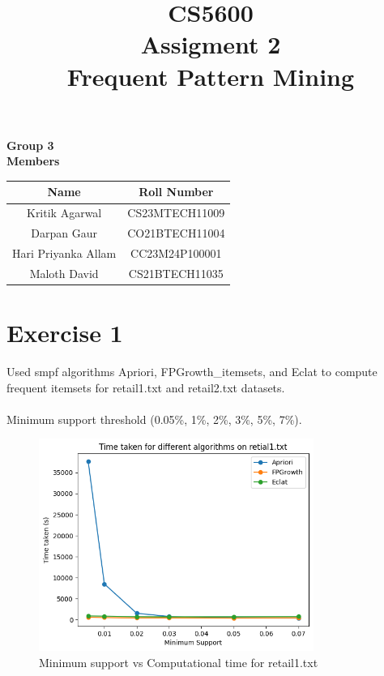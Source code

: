 \documentclass[12pt]{article}
\title{\textbf{\Huge CS5600 \\ Assigment 2 } \\ \textbf{Frequent Pattern Mining}}
\author{}
\date{}
\begin{document}
\maketitle

\begin{center}
    \textbf{\Large Group 3} \\
    \textbf{\large Members} \\
\end{center} 

\begin{center}
\begin{tabular}{ |c|c| }
\hline
\textbf{Name} & \textbf{Roll Number}  \\
\hline
\hline
Kritik Agarwal  & CS23MTECH11009 \\
\hline
Darpan Gaur  & CO21BTECH11004  \\
\hline
Hari Priyanka Allam & CC23M24P100001 \\
\hline
Maloth David  &  	CS21BTECH11035  \\
\hline
\end{tabular}
\end{center}

\newpage

\section*{Exercise 1}
Used smpf algorithms Apriori, FPGrowth\_itemsets, and Eclat to compute frequent itemsets for retail1.txt and retail2.txt datasets. \\
\\
Minimum support threshold (0.05\%, 1\%, 2\%, 3\%, 5\%, 7\%). \\

\begin{figure}[h]
    \centering
    \includegraphics[width=0.8\textwidth]{1a.png}
    \caption{Minimum support vs Computational time for retail1.txt}
\end{figure}
\end{document}
